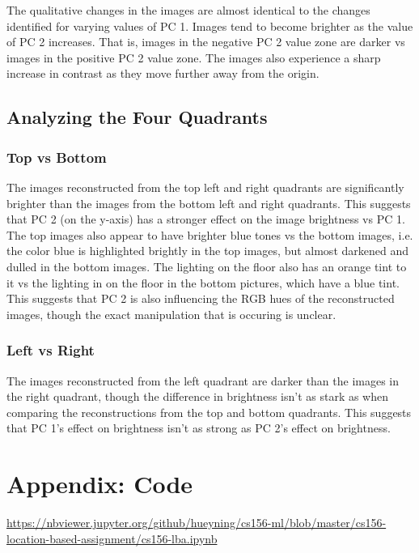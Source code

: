 \documentclass[11pt]{article}
\begin{document}
The qualitative changes in the images are almost identical to the
changes identified for varying values of PC 1. Images tend to become
brighter as the value of PC 2 increases. That is, images in the negative
PC 2 value zone are darker vs images in the positive PC 2 value zone.
The images also experience a sharp increase in contrast as they move
further away from the origin.

\subsection{Analyzing the Four Quadrants}

\subsubsection{Top vs Bottom}

The images reconstructed from the top left and right quadrants are
significantly brighter than the images from the bottom left and right
quadrants. This suggests that PC 2 (on the y-axis) has a stronger effect
on the image brightness vs PC 1. The top images also appear to have
brighter blue tones vs the bottom images, i.e. the color blue is
highlighted brightly in the top images, but almost darkened and dulled
in the bottom images. The lighting on the floor also has an orange tint
to it vs the lighting in on the floor in the bottom pictures, which have
a blue tint. This suggests that PC 2 is also influencing the RGB hues of
the reconstructed images, though the exact manipulation that is occuring
is unclear.

\subsubsection{Left vs Right}

The images reconstructed from the left quadrant are darker than the
images in the right quadrant, though the difference in brightness isn't
as stark as when comparing the reconstructions from the top and bottom
quadrants. This suggests that PC 1's effect on brightness isn't as
strong as PC 2's effect on brightness.
\newpage
\appendix
\section{Appendix: Code}
\url{https://nbviewer.jupyter.org/github/hueyning/cs156-ml/blob/master/cs156-location-based-assignment/cs156-lba.ipynb}


    
    
    
    
\end{document}
